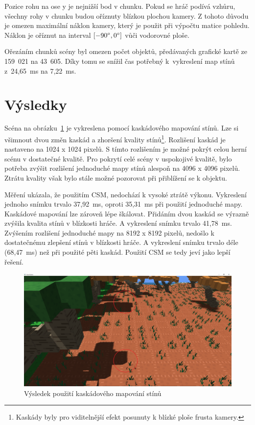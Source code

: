 \documentclass[thesis=M,czech]{FITthesis}[2019/12/23]
\begin{document}
Pozice rohu na ose y je nejnižší bod v chunku. Pokud se hráč podívá vzhůru, všechny rohy v chunku budou oříznuty blízkou plochou kamery. Z tohoto důvodu je omezen maximální náklon kamery, který je použit při výpočtu matice pohledu. Náklon je oříznut na interval $[-90\degree, 0\degree]$ vůči vodorovné ploše.

Ořezáním chunků scény byl omezen počet objektů, předávaných grafické kartě ze 159~021 na 43~605. Díky tomu se snížil čas potřebný k~vykreslení map stínů z~24,65~ms na 7,22~ms.

\section{Výsledky}

Scéna na obrázku~\ref{fig:shadows_csm} je vykreslena pomocí kaskádového mapování stínů. Lze si všimnout dvou změn kaskád a zhoršení kvality stínů\footnote{Kaskády byly pro viditelnější efekt posunuty k blízké ploše frusta kamery.}. Rozlišení kaskád je nastaveno na 1024 x 1024 pixelů. S tímto rozlišením je možné pokrýt celou herní scénu v dostatečné kvalitě. Pro pokrytí celé scény v uspokojivé kvalitě, bylo potřeba zvýšit rozlišení jednoduché mapy stínů alespoň na 4096 x 4096 pixelů. Ztrátu kvality však bylo stále možné pozorovat při přiblížení se k objektu.

Měření ukázala, že použitím CSM, nedochází k vysoké ztrátě výkonu. Vykreslení jednoho snímku trvalo 37,92~ms, oproti 35,31~ms při použití jednoduché mapy. Kaskádové mapování lze zároveň lépe škálovat. Přidáním dvou kaskád se výrazně zvýšila kvalita stínů v blízkosti hráče. A vykreslení snímku trvalo 41,78~ms. Zvýšením rozlišení jednoduché mapy na 8192 x 8192 pixelů, nedošlo k dostatečnému zlepšení stínů v blízkosti hráče. A vykreslení snímku trvalo déle (68,47~ms) než při použité pěti kaskád. Použití CSM se tedy jeví jako lepší řešení.

\begin{figure}\centering
	\includegraphics[width=\textwidth]{images/shadows/csm}
	\caption[Výsledek použití kaskádového mapování stínů]{Výsledek použití kaskádového mapování stínů}\label{fig:shadows_csm}
\end{figure}
\end{document}
